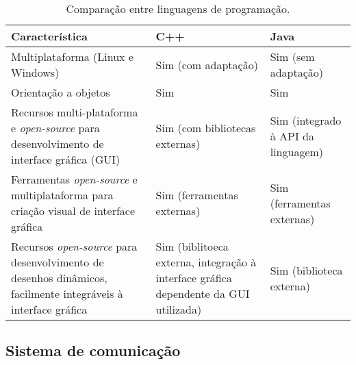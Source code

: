 \begin{table}
  \caption{Comparação entre linguagens de programação.}
  \centering
  \begin{tabular}{p{6cm}|p{4cm}p{4cm}}
    \toprule
    \textbf{Característica} & \textbf{C++} & \textbf{Java} \\
    \hline
    Multiplataforma (Linux e Windows) & Sim (com adaptação) & Sim (sem adaptação) \\
    \hline
    Orientação a objetos & Sim & Sim \\
    \hline
    Recursos multi-plataforma e \textit{open-source} para desenvolvimento de interface gráfica (GUI) & Sim (com bibliotecas externas) & Sim (integrado à API da linguagem) \\
    \hline
    Ferramentas \textit{open-source} e multiplataforma para criação visual de interface gráfica & Sim (ferramentas externas) & Sim (ferramentas externas) \\
    \hline
    Recursos \textit{open-source} para desenvolvimento de desenhos dinâmicos, facilmente integráveis à interface gráfica & Sim (biblitoeca externa, integração à interface gráfica dependente da GUI utilizada) & Sim (biblioteca externa) \\
    \bottomrule
  \end{tabular}
  \label{tab:alternativas_linguagens}
\end{table}



\subsection{Sistema de comunicação}


